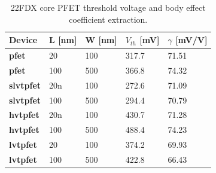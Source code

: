 			\begin{table}[htb!]
				\centering
				\def\arraystretch{1.5}		
				\setlength\arrayrulewidth{1pt}
				\setlength{\tabcolsep}{1em} %
				\fontfamily{\sfdefault}\selectfont 
				\begin{tabular}{|l|l|l|l|l|}	
					\hline 
					\rule[-1ex]{0pt}{2.5ex} \cellcolor{gray!40}\textbf{Device} & \cellcolor{gray!40}\textbf{L [nm]} & \cellcolor{gray!40}\textbf{W [nm]} & \cellcolor{gray!40}\textbf{$V_{th}$ [mV]} & \cellcolor{gray!40}\textbf{$\gamma$ [mV/V]}\\ 
					\hline 
					\rule[-1ex]{0pt}{2.5ex} \textbf{pfet} & 20 & 100 & 317.7 & 71.51 \\ 
					\hline 
					\rule[-1ex]{0pt}{2.5ex} \textbf{pfet} & 100 & 500 & 366.8 & 74.32 \\ 
					\hline 
					\rule[-1ex]{0pt}{2.5ex} \textbf{slvtpfet} & 20n & 100 & 272.6 & 71.09 \\ 
					\hline 
					\rule[-1ex]{0pt}{2.5ex} \textbf{slvtpfet} & 100 & 500 & 294.4 & 70.79 \\ 
					\hline 
					\rule[-1ex]{0pt}{2.5ex} \textbf{hvtpfet} & 20n & 100 & 430.7 & 71.28 \\ 
					\hline 
					\rule[-1ex]{0pt}{2.5ex} \textbf{hvtpfet} & 100 & 500 & 488.4 & 74.23 \\ 
					\hline 
					\rule[-1ex]{0pt}{2.5ex} \textbf{lvtpfet} & 20 & 100 & 374.2 & 69.93 \\ 
					\hline 
					\rule[-1ex]{0pt}{2.5ex} \textbf{lvtpfet} & 100 & 500 & 422.8 & 66.43 \\ 
					\hline 
				\end{tabular} 
				\caption{22FDX core PFET threshold voltage and body effect coefficient extraction.}
				\label{tab:pfet_vth_gamma}
			\end{table} 	
\FloatBarrier

